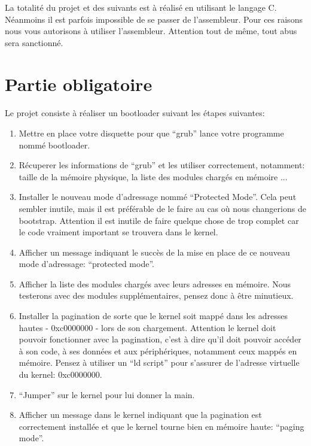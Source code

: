 \documentclass[10pt,a4wide]{article}
\begin{document}
La totalit\'e du projet et des suivants est \`a r\'ealis\'e en utilisant
le langage C. N\'eanmoins il est parfois impossible de se passer de
l'assembleur. Pour ces raisons nous vous autorisons \`a utiliser l'assembleur.
Attention tout de m\^eme, tout abus sera sanctionn\'e.

\section{Partie obligatoire}

\paragraph{}

Le projet consiste \`a r\'ealiser un bootloader suivant les \'etapes suivantes:

\begin{enumerate}

\item Mettre en place votre disquette pour que ``grub'' lance votre programme
      nomm\'e bootloader.
\item R\'ecuperer les informations de ``grub'' et les utiliser correctement,
      notamment: taille de la m\'emoire physique, la liste des modules
      charg\'es en m\'emoire ...
\item Installer le nouveau mode d'adressage nomm\'e ``Protected Mode''.
      Cela peut sembler inutile, mais il est pr\'ef\'erable de le faire
      au cas o\`u nous changerions de bootstrap. Attention il est inutile
      de faire quelque chose de trop complet car le code vraiment
      important se trouvera dans le kernel.
\item Afficher un message indiquant le succ\`es de la mise en place de ce
      nouveau mode d'adressage: ``protected mode''.
\item Afficher la liste des modules charg\'es avec leurs adresses en m\'emoire.
      Nous testerons avec des modules suppl\'ementaires, pensez donc \`a \^etre
      minutieux.
\item Installer la pagination de sorte que le kernel soit mapp\'e dans les
      adresses hautes - 0xc0000000 - lors de son chargement.
      Attention le kernel doit pouvoir fonctionner avec la pagination,
      c'est \`a dire qu'il doit pouvoir acc\'eder \`a son code, \`a ses
      donn\'ees et aux p\'eriph\'eriques, notamment ceux mapp\'es en m\'emoire.
      Pensez \`a utiliser un ``ld script'' pour s'assurer de l'adresse
      virtuelle du kernel: 0xc0000000.
\item ``Jumper'' sur le kernel pour lui donner la main.
\item Afficher un message dans le kernel indiquant que la pagination est
      correctement install\'ee et que le kernel tourne bien en m\'emoire haute:
      ``paging mode''.

\end{enumerate}
\end{document}
